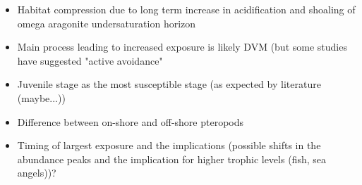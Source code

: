 \begin{itemize}
    \item Habitat compression due to long term increase in acidification and shoaling of omega aragonite undersaturation horizon
    \item Main process leading to increased exposure is likely DVM (but some studies have suggested "active avoidance"
    \item Juvenile stage as the most susceptible stage (as expected by literature (maybe...))
    \item Difference between on-shore and off-shore pteropods
    \item Timing of largest exposure and the implications (possible shifts in the abundance peaks and the implication for higher trophic levels (fish, sea angels))?
\end{itemize}